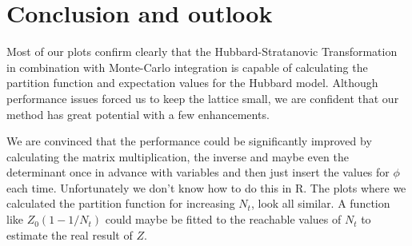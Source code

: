 \section{Conclusion and outlook}
Most of our plots confirm clearly that the Hubbard-Stratanovic Transformation in combination with Monte-Carlo integration is capable of calculating the partition function and expectation values for the Hubbard model. Although performance issues forced us to keep the lattice small, we are confident that our method has great potential with a few enhancements. 

We are convinced that the performance could be significantly improved by calculating the matrix multiplication, the inverse and maybe even the determinant once in advance with variables and then just insert the values for $\phi$ each time. Unfortunately we don't know how to do this in R.
The plots where we calculated the partition function for increasing $N_t$, look all similar. A function like $Z_0(1-1/N_t)$ could maybe be fitted to the reachable values of $N_t$ to estimate the real result of $Z$.